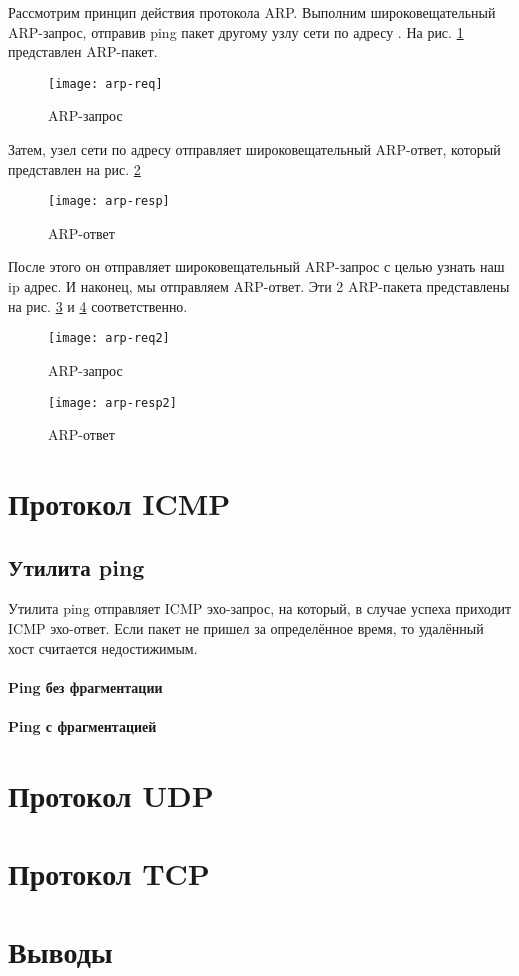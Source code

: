 Рассмотрим принцип действия протокола ARP. Выполним широковещательный ARP-запрос, отправив ping пакет другому узлу сети по адресу .  На рис. \ref{fig:arp-req} представлен ARP-пакет.

\begin{figure}[H]
	\centering
	\texttt{[image: arp-req]}
	\caption{ARP-запрос}
	\label{fig:arp-req}
\end{figure}

Затем, узел сети по адресу  отправляет широковещательный ARP-ответ, который представлен на рис. \ref{fig:arp-resp}

\begin{figure}[H]
	\centering
	\texttt{[image: arp-resp]}
	\caption{ARP-ответ}
	\label{fig:arp-resp}
\end{figure}

После этого он отправляет широковещательный ARP-запрос с целью узнать наш ip адрес. И наконец, мы отправляем ARP-ответ. Эти 2 ARP-пакета представлены на рис. \ref{fig:arp-req2} и \ref{fig:arp-resp2} соответственно. 

\begin{figure}[H]
	\centering
	\texttt{[image: arp-req2]}
	\caption{ARP-запрос}
	\label{fig:arp-req2}
\end{figure}

\begin{figure}[H]
	\centering
	\texttt{[image: arp-resp2]}
	\caption{ARP-ответ}
	\label{fig:arp-resp2}
\end{figure}

\section{Протокол ICMP}

\subsection{Утилита ping}

Утилита ping отправляет ICMP эхо-запрос, на который, в случае успеха приходит ICMP эхо-ответ. Если пакет не пришел за определённое время, то удалённый хост считается недостижимым.

\paragraph{Ping без фрагментации}

\paragraph{Ping с фрагментацией}



\section{Протокол UDP}

\section{Протокол TCP}

\section{Выводы}


